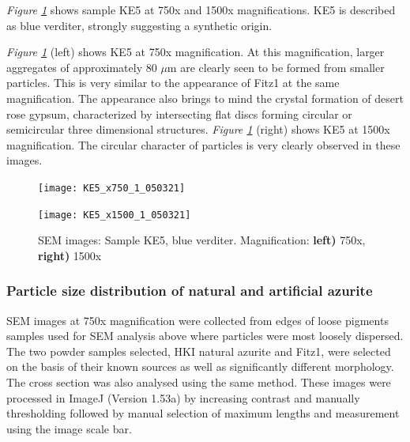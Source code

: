 \textit{Figure \ref{fig:KE5_sem_1}} shows sample KE5 at 750x and 1500x magnifications. KE5 is described as blue verditer, strongly suggesting a synthetic origin.

\textit{Figure \ref{fig:KE5_sem_1}} (left) shows KE5 at 750x magnification. At this magnification, larger aggregates of approximately 80 $\mu$m are clearly seen to be formed from smaller particles. This is very similar to the appearance of Fitz1 at the same magnification. The appearance also brings to mind the crystal formation of desert rose gypsum, characterized by intersecting flat discs forming circular or semicircular three dimensional structures. \textit{Figure \ref{fig:KE5_sem_1}} (right) shows KE5 at 1500x magnification. The circular character of particles is very clearly observed in these images.


\begin{figure}[H]
\centering
\begin{minipage}{.45\textwidth}
  \centering
  \texttt{[image: KE5\_x750\_1\_050321]}
\end{minipage}
\begin{minipage}{.45\textwidth}
  \centering
  \texttt{[image: KE5\_x1500\_1\_050321]}
\end{minipage}
\caption[SEM images: Sample KE5, blue verditer]{SEM images: Sample KE5, blue verditer. Magnification: \textbf{left)} 750x, \textbf{right)} 1500x}
\label{fig:KE5_sem_1}
\end{figure}

\subsubsection[Particle size distribution of natural and artificial azurite]{Particle size distribution of natural and artificial azurite}
\label{subsubsection3.1.1.1}

SEM images at 750x magnification were collected from edges of loose pigments samples used for SEM analysis above where particles were most loosely dispersed. The two powder samples selected, HKI natural azurite and Fitz1, were selected on the basis of their known sources as well as significantly different morphology. The cross section was also analysed using the same method. These images were processed in ImageJ (Version 1.53a) by increasing contrast and manually thresholding followed by manual selection of maximum lengths and measurement using the image scale bar. 

